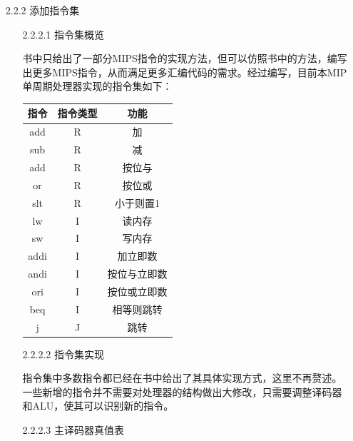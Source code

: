 \documentclass[UTF8]{article}
\begin{document}
\begin{enumerate}
\begin{enumerate}
\begin{figure}[htbp]
					\end{figure}
				\item [2.2.2] 添加指令集
					\begin{enumerate}
						\item [2.2.2.1] 指令集概览
							\par 书中只给出了一部分MIPS指令的实现方法，但可以仿照书中的方法，编写出更多MIPS指令，从而满足更多汇编代码的需求。经过编写，目前本MIP单周期处理器实现的指令集如下：\\
							\begin{tabular}{|c|c|c|} \hline
								指令 & 指令类型 & 功能         \\ \hline 
								add  & R       & 加           \\ \hline 
								sub  & R       & 减           \\ \hline 
								add  & R       & 按位与       \\ \hline 
								or   & R       & 按位或       \\ \hline 
								slt  & R       & 小于则置1    \\ \hline 
								lw   & I       & 读内存       \\ \hline 
								sw   & I       & 写内存       \\ \hline 
								addi & I       & 加立即数     \\ \hline 
								andi & I       & 按位与立即数 \\ \hline 
								ori  & I       & 按位或立即数 \\ \hline 
								beq  & I       & 相等则跳转   \\ \hline 
								j    & J       & 跳转        \\ \hline 
							\end{tabular}
						\item [2.2.2.2] 指令集实现
							\par 指令集中多数指令都已经在书中给出了其具体实现方式，这里不再赘述。一些新增的指令并不需要对处理器的结构做出大修改，只需要调整译码器和ALU，使其可以识别新的指令。
						\item [2.2.2.3] 主译码器真值表\\
\end{enumerate}
\end{enumerate}
\end{enumerate}
\end{document}
